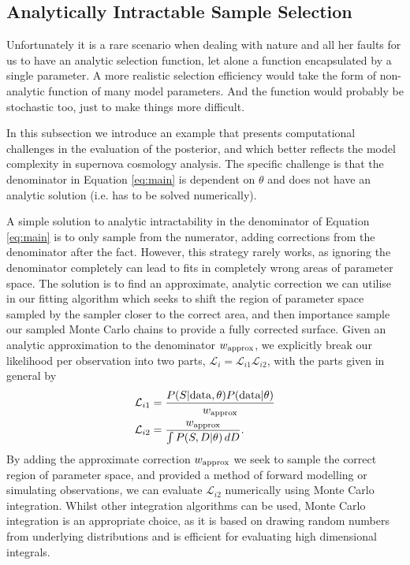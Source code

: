 \documentclass[a4paper,fleqn,usenatbib]{mnras}
\begin{document}
\subsection{Analytically Intractable Sample Selection}
\label{sec:real}
Unfortunately it is a rare scenario when dealing with nature and all her faults for us to have an analytic selection function, let alone a function encapsulated by a single parameter. A more realistic selection efficiency would take the form of non-analytic function of many model parameters. And the function would probably be stochastic too, just to make things more difficult. 

In this subsection we introduce an example that presents computational challenges in the evaluation of the posterior, and which better reflects the model complexity in supernova cosmology analysis. The specific challenge is that the denominator in Equation \eqref{eq:main} is dependent on $\theta$ and does not have an analytic solution (i.e. has to be solved numerically). 


A simple solution to analytic intractability in the denominator of Equation \eqref{eq:main} is to only sample from the numerator, adding corrections from the denominator after the fact. However, this strategy rarely works, as ignoring the denominator completely can lead to fits in completely wrong areas of parameter space. The solution is to find an approximate, analytic correction we can utilise in our fitting algorithm which seeks to shift the region of parameter space sampled by the sampler closer to the correct area, and then importance sample our sampled Monte Carlo chains to provide a fully corrected surface. Given an analytic approximation to the denominator $w_{\rm approx}$, we explicitly break our likelihood per observation into two parts, $\mathcal{L}_i = \mathcal{L}_{i1} \mathcal{L}_{i2}$, with the parts given in general by
\begin{align}
\mathcal{L}_{i1} &= \frac{P(S|{\rm data},\theta) P({\rm data}|\theta)}{w_{\rm approx}} \\
\mathcal{L}_{i2} &= \frac{w_{\rm approx}}{\int P(S, D|\theta)\, dD}.
\end{align}
By adding the approximate correction $w_{\rm approx}$ we seek to sample the correct region of parameter space, and provided a method of forward modelling or simulating observations, we can evaluate $\mathcal{L}_{i2}$ numerically using Monte Carlo integration. Whilst other integration algorithms can be used, Monte Carlo integration is an appropriate choice, as it is based on drawing random numbers from underlying distributions and is efficient for evaluating high dimensional integrals.	
\end{document}
